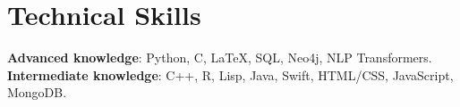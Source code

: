 \documentclass[letterpaper,11pt]{article}
\begin{document}

%
\section{Technical Skills}
 \begin{itemize}[leftmargin=0.15in, label={}]
    \small{\item{
     \textbf{Advanced knowledge}{: Python, C, \LaTeX, SQL, Neo4j, NLP Transformers.} \\
     \textbf{Intermediate knowledge}{: C++, R, Lisp, Java, Swift, HTML/CSS, JavaScript, MongoDB.}
    }}
 \end{itemize}


\end{document}

